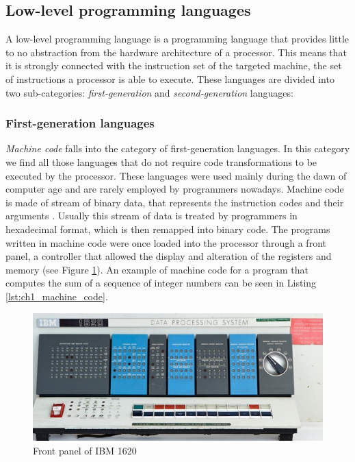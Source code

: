 \subsection{Low-level programming languages}
\label{subsec:ch1_ll_languages}
A low-level programming language is a programming language that provides little to no abstraction from the hardware architecture of a processor. This means that it is strongly connected with the instruction set of the targeted machine, the set of instructions a processor is able to execute. These languages are divided into two sub-categories: \textit{first-generation} and \textit{second-generation} languages:

\subsubsection*{First-generation languages}
\textit{Machine code} falls into the category of first-generation languages. In this category we find all those languages that do not require code transformations to be executed by the processor. These languages were used mainly during the dawn of computer age and are rarely employed by programmers nowadays. Machine code is made of stream of binary data, that represents the instruction codes and their arguments \cite{guide2011intel, seal2001arm}. Usually this stream of data is treated by programmers in hexadecimal format, which is then remapped into binary code. The programs written in machine code were once loaded into the processor through a front panel, a controller that allowed the display and alteration of the registers and memory (see Figure \ref{fig:ch1_front_panel}). An example of machine code for a program that computes the sum of a sequence of integer numbers can be seen in Listing \ref{lst:ch1_machine_code}.

\begin{figure}
	\centering
	\includegraphics[width = \textwidth]{Figures/ch1_front_panel}
	\caption{Front panel of IBM 1620}
	\label{fig:ch1_front_panel}
\end{figure}

